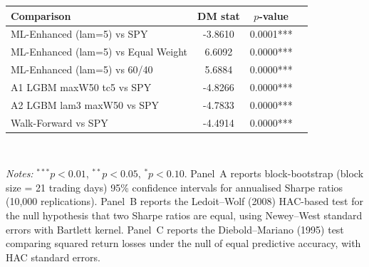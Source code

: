 \begin{table}[htbp]
\begin{tabular}{lccc}
\midrule
Comparison & DM stat & $p$-value & \\
\midrule
ML-Enhanced (lam=5) vs SPY & -3.8610 & 0.0001*** \\
ML-Enhanced (lam=5) vs Equal Weight & 6.6092 & 0.0000*** \\
ML-Enhanced (lam=5) vs 60/40 & 5.6884 & 0.0000*** \\
A1 LGBM maxW50 tc5 vs SPY & -4.8266 & 0.0000*** \\
A2 LGBM lam3 maxW50 vs SPY & -4.7833 & 0.0000*** \\
Walk-Forward vs SPY & -4.4914 & 0.0000*** \\
\bottomrule
\end{tabular}
\\[6pt]
\begin{minipage}{0.9\textwidth}
\footnotesize
\textit{Notes:} $^{***}p<0.01$, $^{**}p<0.05$, $^{*}p<0.10$. Panel~A reports block-bootstrap (block size = 21 trading days) 95\% confidence intervals for annualised Sharpe ratios (10,000 replications). Panel~B reports the Ledoit--Wolf (2008) HAC-based test for the null hypothesis that two Sharpe ratios are equal, using Newey--West standard errors with Bartlett kernel. Panel~C reports the Diebold--Mariano (1995) test comparing squared return losses under the null of equal predictive accuracy, with HAC standard errors.
\end{minipage}
\end{table}